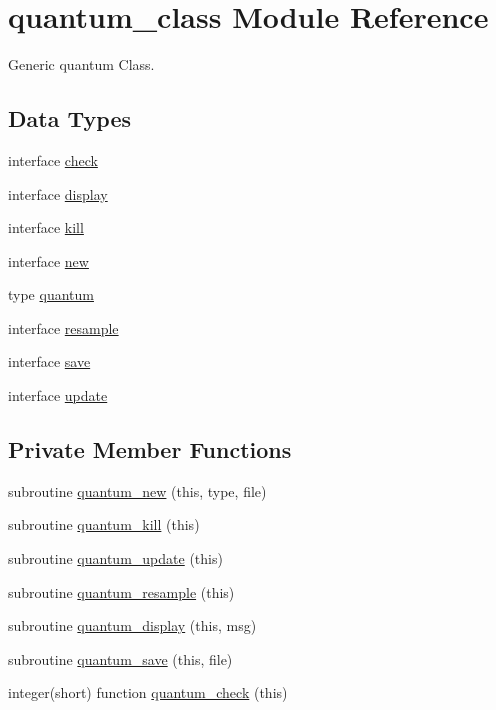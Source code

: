 \hypertarget{classquantum__class}{\section{quantum\-\_\-class Module Reference}
\label{classquantum__class}
}


Generic quantum Class.  


\subsection*{Data Types}
\begin{DoxyCompactItemize}
\item 
interface \hyperlink{interfacequantum__class_1_1check}{check}
\item 
interface \hyperlink{interfacequantum__class_1_1display}{display}
\item 
interface \hyperlink{interfacequantum__class_1_1kill}{kill}
\item 
interface \hyperlink{interfacequantum__class_1_1new}{new}
\item 
type \hyperlink{structquantum__class_1_1quantum}{quantum}
\item 
interface \hyperlink{interfacequantum__class_1_1resample}{resample}
\item 
interface \hyperlink{interfacequantum__class_1_1save}{save}
\item 
interface \hyperlink{interfacequantum__class_1_1update}{update}
\end{DoxyCompactItemize}
\subsection*{Private Member Functions}
\begin{DoxyCompactItemize}
\item 
subroutine \hyperlink{classquantum__class_a3170f42702712b16bcc152509752f18e}{quantum\-\_\-new} (this, type, file)
\item 
subroutine \hyperlink{classquantum__class_a1c73725245a04e63092d2152579c4bd9}{quantum\-\_\-kill} (this)
\item 
subroutine \hyperlink{classquantum__class_afef9cff48e6cd580f47a06f4adc4109b}{quantum\-\_\-update} (this)
\item 
subroutine \hyperlink{classquantum__class_a496266b0eb772dd0e7d8ce9d8439945a}{quantum\-\_\-resample} (this)
\item 
subroutine \hyperlink{classquantum__class_a163174aa7cc6ae0a03b2269c55ca05b8}{quantum\-\_\-display} (this, msg)
\item 
subroutine \hyperlink{classquantum__class_aa60138cf5e19494d1f29b63053b32f24}{quantum\-\_\-save} (this, file)
\item 
integer(short) function \hyperlink{classquantum__class_a7ed38fd0b1d221dd04ca645722602f7d}{quantum\-\_\-check} (this)
\end{DoxyCompactItemize}


